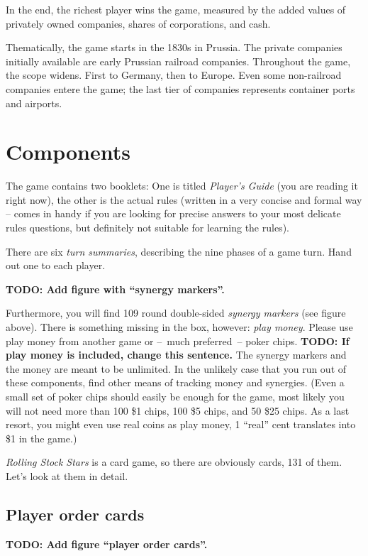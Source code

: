 \documentclass[10pt,final]{report}
\begin{document}
\begin{multicols}{2}
In the end, the richest player wins the game, measured by the added
values of privately owned companies, shares of corporations, and cash.

Thematically, the game starts in the 1830s in Prussia. The private
companies initially available are early Prussian railroad
companies. Throughout the game, the scope widens. First to Germany,
then to Europe. Even some non-railroad companies entere the game; the
last tier of companies represents container ports and airports.

\section{Components}

The game contains two booklets: One is titled \emph{Player's Guide}
(you are reading it right now), the other is the actual rules (written
in a very concise and formal way -- comes in handy if you are looking
for precise answers to your most delicate rules questions, but
definitely not suitable for learning the rules).

There are six \emph{turn summaries}, describing the nine phases of
a game turn. Hand out one to each player. 

\textbf{TODO: Add figure with ``synergy markers''.}

Furthermore, you will find 109 round double-sided \emph{synergy
  markers} (see figure above). There is something missing in the box,
however: \emph{play money}.  Please use play money from another game
or --~much preferred~-- poker chips. \textbf{TODO: If play money is
  included, change this sentence.} The synergy markers and the money
are meant to be unlimited. In the unlikely case that you run out of
these components, find other means of tracking money and synergies.
(Even a small set of poker chips should easily be enough for the game,
most likely you will not need more than 100 \$1 chips, 100 \$5 chips,
and 50 \$25 chips. As a last resort, you might even use real coins as
play money, 1 ``real'' cent translates into \$1 in the game.)

\emph{Rolling Stock Stars} is a card game, so there are obviously cards, 131
of them. Let's look at them in detail.

\subsection{Player order cards}

\textbf{TODO: Add figure ``player order cards''.}


\end{multicols}
\end{document}

